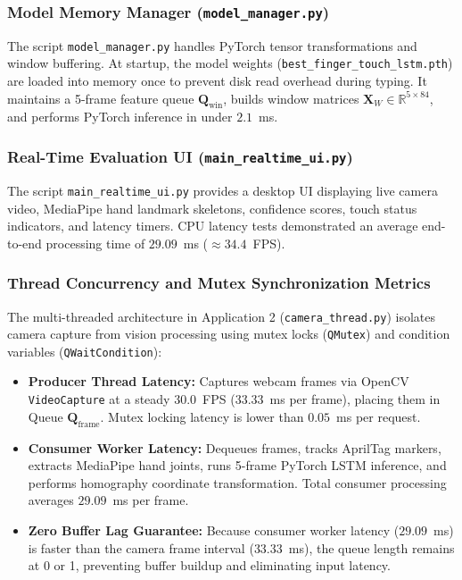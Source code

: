 \subsubsection{Model Memory Manager (\texttt{model\_manager.py})}
The script \texttt{model\_manager.py} handles PyTorch tensor transformations and window buffering. At startup, the model weights (\texttt{best\_finger\_touch\_lstm.pth}) are loaded into memory once to prevent disk read overhead during typing. It maintains a 5-frame feature queue $\mathbf{Q}_{\text{win}}$, builds window matrices $\mathbf{X}_W \in \mathbb{R}^{5 \times 84}$, and performs PyTorch inference in under $2.1$~ms.

\subsubsection{Real-Time Evaluation UI (\texttt{main\_realtime\_ui.py})}
The script \texttt{main\_realtime\_ui.py} provides a desktop UI displaying live camera video, MediaPipe hand landmark skeletons, confidence scores, touch status indicators, and latency timers. CPU latency tests demonstrated an average end-to-end processing time of $29.09$~ms ($\approx 34.4$~FPS).

\subsubsection{Thread Concurrency and Mutex Synchronization Metrics}
The multi-threaded architecture in Application 2 (\texttt{camera\_thread.py}) isolates camera capture from vision processing using mutex locks (\texttt{QMutex}) and condition variables (\texttt{QWaitCondition}):
\begin{itemize}
    \item \textbf{Producer Thread Latency:} Captures webcam frames via OpenCV \texttt{VideoCapture} at a steady $30.0$~FPS ($33.33$~ms per frame), placing them in Queue $\mathbf{Q}_{\text{frame}}$. Mutex locking latency is lower than $0.05$~ms per request.
    \item \textbf{Consumer Worker Latency:} Dequeues frames, tracks AprilTag markers, extracts MediaPipe hand joints, runs 5-frame PyTorch LSTM inference, and performs homography coordinate transformation. Total consumer processing averages $29.09$~ms per frame.
    \item \textbf{Zero Buffer Lag Guarantee:} Because consumer worker latency ($29.09$~ms) is faster than the camera frame interval ($33.33$~ms), the queue length remains at 0 or 1, preventing buffer buildup and eliminating input latency.
\end{itemize}

